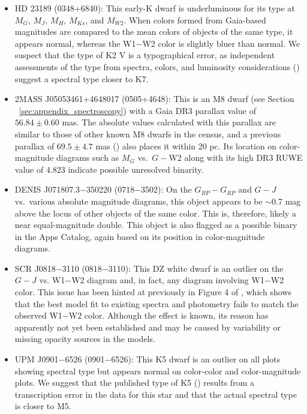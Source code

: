 \documentclass[twocolumn,tighten,twocolappendix]{aastex631}
\begin{document}
\begin{itemize}
\item HD 23189 (0348+6840): This early-K dwarf is underluminous for its type at $M_G$, $M_J$, $M_H$, $M_{Ks}$, and $M_{W2}$. When colors formed from Gaia-based magnitudes are compared to the mean colors of objects of the same type, it appears normal, whereas the W1$-$W2 color is slightly bluer than normal. We suspect that the \cite{gray2003} type of K2 V is a typographical error, as independent assessments of the type from spectra, colors, and luminosity considerations (\citealt{adams1935, bidelman1985, mermilliod1987, stassun2019}) suggest a spectral type closer to K7.

\item 2MASS J05053461+4648017 (0505+4648): This is an M8 dwarf (see Section ~\ref{sec:appendix_spectroscopy}) with a Gaia DR3 parallax value of $56.84{\pm}0.60$ mas. The absolute values calculated with this parallax are similar to those of other known M8 dwarfs in the census, and a previous parallax of $69.5{\pm}4.7$ mas (\citealt{dittmann2014}) also places it within 20 pc. Its location on color-magnitude diagrams such as $M_G$ vs.\ $G-$W2 along with its high DR3 RUWE value of 4.823 indicate possible unresolved binarity.

\item DENIS J071807.3$-$350220 (0718$-$3502): On the $G_{BP}-G_{RP}$ and $G-J$ vs.\ various absolute magnitude diagrams, this object appears to be $\sim$0.7 mag above the locus of other objects of the same color. This is, therefore, likely a near equal-magnitude double. This object is also flagged as a possible binary in the Apps Catalog, again based on its position in color-magnitude diagrams.

\item SCR J0818$-$3110 (0818$-$3110): This DZ white dwarf is an outlier on the $G-J$ vs. W1$-$W2 diagram and, in fact, any diagram involving W1$-$W2 color. This issue has been hinted at previously in Figure 4 of \cite{kawka2021}, which shows that the best model fit to existing spectra and photometry fails to match the observed W1$-$W2 color. Although the effect is known, its reason has apparently not yet been established and may be caused by variability or missing opacity sources in the models.

\item UPM J0901$-$6526 (0901$-$6526): This K5 dwarf is an outlier on all plots showing spectral type but appears normal on color-color and color-magnitude plots. We suggest that the published type of K5 (\citealt{riaz2006}) results from a transcription error in the data for this star and that the actual spectral type is closer to M5.


\end{itemize}
\end{document}
